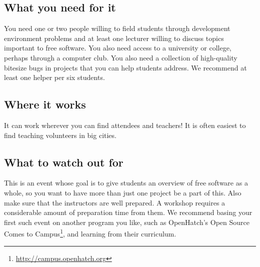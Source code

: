 \subsection{What you need for it}
You need one or two people willing to field students through development environment problems and at least one lecturer willing to discuss topics important to free software. You also need access to a university or college, perhaps through a computer club. You also need a collection of high-quality bitesize bugs in projects that you can help students address. We recommend at least one helper per six students.

\subsection{Where it works}
It can work wherever you can find attendees and teachers! It is often easiest to find teaching volunteers in big cities.

\subsection{What to watch out for}
This is an event whose goal is to give students an overview of free software as a whole, so you want to have more than just one project be a part of this. Also make sure that the instructors are well prepared. A workshop requires a considerable amount of preparation time from them. We recommend basing your first such event on another program you like, such as OpenHatch’s Open Source Comes to Campus\footnote{\url{http://campus.openhatch.org}}, and learning from their curriculum.